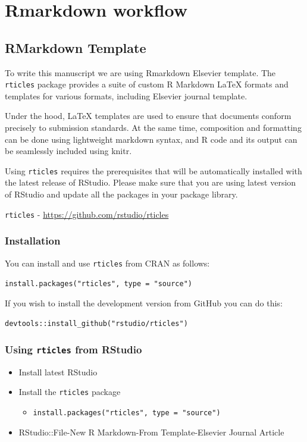 \documentclass[]{book}
\providecommand{\tightlist}{%
  \setlength{\itemsep}{0pt}\setlength{\parskip}{0pt}}
\begin{document}
\chapter{Rmarkdown workflow}\label{rmarkdown-workflow}

\section{RMarkdown Template}\label{rmarkdown-template}

To write this manuscript we are using Rmarkdown Elsevier template. The
\texttt{rticles} package provides a suite of custom R Markdown LaTeX
formats and templates for various formats, including Elsevier journal
template.

Under the hood, LaTeX templates are used to ensure that documents
conform precisely to submission standards. At the same time, composition
and formatting can be done using lightweight markdown syntax, and R code
and its output can be seamlessly included using knitr.

Using \texttt{rticles} requires the prerequisites that will be
automatically installed with the latest release of RStudio. Please make
sure that you are using latest version of RStudio and update all the
packages in your package library.

\texttt{rticles} - \url{https://github.com/rstudio/rticles}

\subsection{Installation}\label{installation}

You can install and use \texttt{rticles} from CRAN as follows:

\texttt{install.packages("rticles",\ type\ =\ "source")}

If you wish to install the development version from GitHub you can do
this:

\texttt{devtools::install\_github("rstudio/rticles")}

\subsection{\texorpdfstring{Using \texttt{rticles} from
RStudio}{Using rticles from RStudio}}\label{using-rticles-from-rstudio}

\begin{itemize}
\tightlist
\item
  Install latest RStudio
\item
  Install the \texttt{rticles} package

  \begin{itemize}
  \tightlist
  \item
    \texttt{install.packages("rticles",\ type\ =\ "source")}
  \end{itemize}
\item
  RStudio::File-New R Markdown-From Template-Elsevier Journal Article
\end{itemize}
\end{document}
